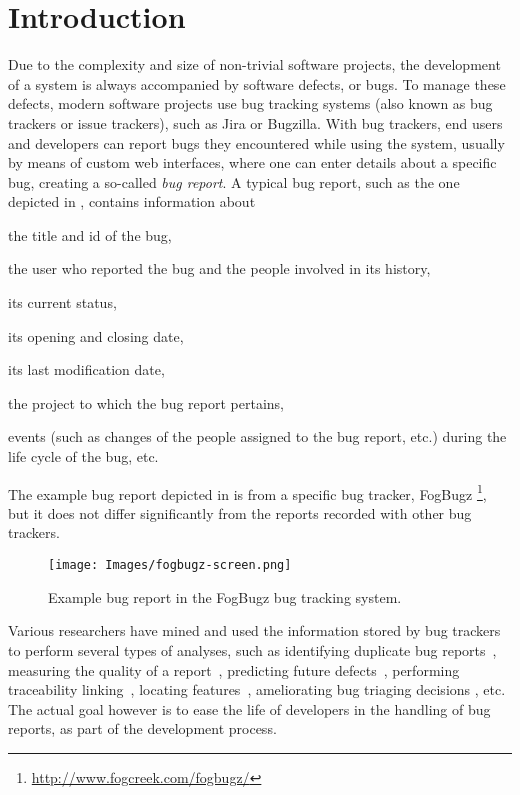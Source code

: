 \section{Introduction}

Due to the complexity and size of non-trivial software projects, the development of a system is always accompanied by software defects, or bugs. To manage these defects, modern software projects use bug tracking systems (also known as bug trackers or issue trackers), such as Jira or Bugzilla. With bug trackers, end users and developers can report bugs they encountered while using the system, usually by means of custom web interfaces, where one can enter details about a specific bug, creating a so-called \emph{bug report}. A typical bug report, such as the one depicted in , contains information about \begin{inparaenum}[(1)] \item the title and id of the bug, \item the user who reported the bug and the people involved in its history, \item its current status, \item its opening and closing date, \item its last modification date, \item the project to which the bug report pertains, \item events (such as changes of the people assigned to the bug report, etc.) during the life cycle of the bug, etc. \end{inparaenum} The example bug report depicted in  is from a specific bug tracker, FogBugz \footnote{\url{http://www.fogcreek.com/fogbugz/}}, but it does not differ significantly from the reports recorded with other bug trackers. 

\begin{figure}[ht]
\centering
\texttt{[image: Images/fogbugz-screen.png]}
\caption{Example bug report in the FogBugz bug tracking system.}
\label{fogbugz-example}
\end{figure}

Various researchers have mined and used the information stored by bug trackers to perform several types of analyses, such as identifying duplicate bug reports~\cite{Wang08a}, measuring the quality of a report~\cite{Bettenburg08}, predicting future defects~\cite{DAmb2012a}, performing traceability linking~\cite{Biss2013a}, locating features~\cite{Dit2013a}, ameliorating bug triaging decisions \cite{Anvi06a}, etc. The actual goal however is to ease the life of developers in the handling of bug reports, as part of the development process.

